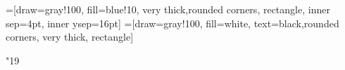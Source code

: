 

=[draw=gray!100, fill=blue!10, very thick,rounded corners, rectangle, inner sep=4pt, inner ysep=16pt]
=[draw=gray!100, fill=white, text=black,rounded corners, very thick, rectangle]
\newcommand\nicebox[2]{
	{\centering
	\begin{tikzpicture}
		\node [nicebox](box){
			\begin{minipage}{0.95\textwidth}\centering
			\begin{minipage}{0.95\textwidth}
						#2
			\end{minipage}\end{minipage}};
		\node[niceboxtitle, right=10pt] at (box.north west)
			{\small\textbf{#1}};
	\end{tikzpicture}\par}
}



\newcommand{\todoi}{\todo[inline]}

\DeclareMathSymbol \uppi {} {"19}

%



\renewcommand{\showlabelfont}{\tiny}

\graphicspath{{IPython/}{Images/}}

\setlength{\extrarowheight}{3pt}


